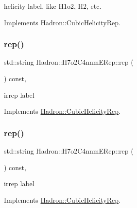 helicity label, like H1o2, H2, etc. 

Implements \mbox{\hyperlink{structHadron_1_1CubicHelicityRep_af1096946b7470edf0a55451cc662f231}{Hadron\+::\+Cubic\+Helicity\+Rep}}.

\mbox{\label{structHadron_1_1H7o2C4nnmERep_a42e882ae78a0d7fd00653fa44e65f81f}} 
\subsubsection{\texorpdfstring{rep()}{rep()}\hspace{0.1cm}{\footnotesize\ttfamily [1/2]}}
{\footnotesize\ttfamily std\+::string Hadron\+::\+H7o2\+C4nnm\+E\+Rep\+::rep (\begin{DoxyParamCaption}{ }\end{DoxyParamCaption}) const\hspace{0.3cm}{\ttfamily [inline]}, {\ttfamily [virtual]}}

irrep label 

Implements \mbox{\hyperlink{structHadron_1_1CubicHelicityRep_a8cdd86f068a167dc96faef02bfb8a33d}{Hadron\+::\+Cubic\+Helicity\+Rep}}.

\mbox{\label{structHadron_1_1H7o2C4nnmERep_a42e882ae78a0d7fd00653fa44e65f81f}} 
\subsubsection{\texorpdfstring{rep()}{rep()}\hspace{0.1cm}{\footnotesize\ttfamily [2/2]}}
{\footnotesize\ttfamily std\+::string Hadron\+::\+H7o2\+C4nnm\+E\+Rep\+::rep (\begin{DoxyParamCaption}{ }\end{DoxyParamCaption}) const\hspace{0.3cm}{\ttfamily [inline]}, {\ttfamily [virtual]}}

irrep label 

Implements \mbox{\hyperlink{structHadron_1_1CubicHelicityRep_a8cdd86f068a167dc96faef02bfb8a33d}{Hadron\+::\+Cubic\+Helicity\+Rep}}.

\mbox{\label{structHadron_1_1H7o2C4nnmERep_a31bbba3df84a0943bb90635b1c99e5f0}} 
